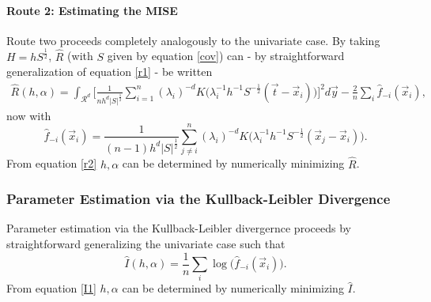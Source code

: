 \paragraph{Route 2: Estimating the MISE}
Route two proceeds completely analogously to the univariate case. By taking $H=hS^{\frac{1}{2}}$, $\hat{R}$ (with $S$ given by equation \eqref{cov}) can - by straightforward generalization of equation \eqref{r1} - be written
\begin{equation}
	\begin{split}
		\hat{R}(h,\alpha)=\int_{\mathcal{R}^d} \bigg[\frac{1}{nh^d|S|^{\frac{1}{2}}}\sum_{i=1}^n(\lambda_i)^{-d}K\big(\lambda_i^{-1}h^{-1}S^{-\frac{1}{2}}(\vec{t}-\vec{x}_i)\big)\bigg]^2d\vec{y}-\frac{2}{n}\sum_{i}\hat{f}_{-i}(\vec{x}_i),
	\end{split}
	\label{r2}
\end{equation}
now with
\begin{equation}
	\hat{f}_{-i}(\vec{x}_i)=\frac{1}{(n-1)h^d|S|^{\frac{1}{2}}}\sum_{j\neq i}^n(\lambda_i)^{-d}K\big(\lambda_i^{-1}h^{-1}S^{-\frac{1}{2}}(\vec{x}_j-\vec{x}_i)\big).
\end{equation} 
From equation \eqref{r2} $h,\alpha$ can be determined by numerically minimizing $\hat{R}$. 

\subsubsection{Parameter Estimation via the Kullback-Leibler Divergence}
Parameter estimation via the Kullback-Leibler divergernce proceeds by straightforward generalizing the univariate case such that
\begin{equation}
	\hat{I}(h,\alpha)=\frac{1}{n}\sum_{i}\log\big(\hat{f}_{-i}(\vec{x}_i)\big).
	\label{I1}
\end{equation}
From equation \eqref{I1} $h,\alpha$ can be determined by numerically minimizing $\hat{I}$.




